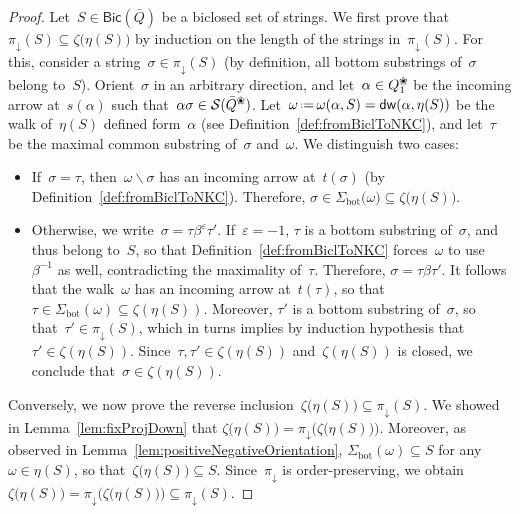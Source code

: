 \documentclass{amsart}
\theoremstyle{definition}
\newcommand{\ssm}{\smallsetminus} %
\newcommand{\eqdef}{\mbox{\,\raisebox{0.2ex}{\scriptsize\ensuremath{\mathrm:}}\ensuremath{=}\,}} %
\newcommand{\blossom}{^\text{\ding{96}}} %
\newcommand{\strings}{\mathcal{S}} %
\newcommand{\distinguishedWalk}[2]{\mathsf{dw}(#1,#2)} %
\newcommand{\bottom}{\mathrm{bot}} %
\newcommand{\Bicl}[1]{\mathsf{Bic}(#1)} %
\newcommand{\projDown}{\pi_\downarrow} %
\begin{document}
\begin{proof}
Let~$S \in \Bicl{\bar Q}$ be a biclosed set of strings.
We first prove that~$\projDown(S) \subseteq \zeta \big( \eta(S) \big)$ by induction on the length of the strings in~$\projDown(S)$.
For this, consider a string~$\sigma \in \projDown(S)$ (by definition, all bottom substrings of~$\sigma$ belong to~$S$).
Orient~$\sigma$ in an arbitrary direction, and let~$\alpha \in Q_1\blossom$ be the incoming arrow at~$s(\alpha)$ such that~$\alpha \sigma \in \strings(\bar Q\blossom)$.
Let~$\omega \eqdef \omega(\alpha,S) = \distinguishedWalk{\alpha}{\eta(S)}$ be the walk of~$\eta(S)$ defined form~$\alpha$ (see Definition~\ref{def:fromBiclToNKC}), and let~$\tau$ be the maximal common substring of~$\sigma$ and~$\omega$.
We distinguish two cases:
\begin{itemize}
\item If~$\sigma = \tau$, then~$\omega \ssm \sigma$ has an incoming arrow at~$t(\sigma)$ (by Definition~\ref{def:fromBiclToNKC}). Therefore, $\sigma \in \Sigma_\bottom \big( \omega \big) \subseteq \zeta \big( \eta(S) \big)$.
\item Otherwise, we write~$\sigma = \tau \beta^\varepsilon \tau'$. If~$\varepsilon = -1$, $\tau$ is a bottom substring of~$\sigma$, and thus belong to~$S$, so that Definition~\ref{def:fromBiclToNKC} forces~$\omega$ to use~$\beta^{-1}$ as well, contradicting the maximality of~$\tau$. Therefore, $\sigma = \tau \beta \tau'$. It follows that the walk~$\omega$ has an incoming arrow at~$t(\tau)$, so that~$\tau \in \Sigma_\bottom(\omega) \subseteq \zeta(\eta(S))$. Moreover, $\tau'$ is a bottom substring of~$\sigma$, so that~$\tau' \in \projDown(S)$, which in turns implies by induction hypothesis that~$\tau' \in \zeta(\eta(S))$. Since~$\tau, \tau' \in \zeta(\eta(S))$ and~$\zeta(\eta(S))$ is closed, we conclude that~$\sigma \in \zeta(\eta(S))$.
\end{itemize}

\medskip
Conversely, we now prove the reverse inclusion~$\zeta \big( \eta(S) \big) \subseteq \projDown(S)$.
We showed in Lemma~\ref{lem:fixProjDown} that ${\zeta \big( \eta(S) \big) = \projDown \big( \zeta \big( \eta(S) \big) \big)}$. 
Moreover, as observed in Lemma~\ref{lem:positiveNegativeOrientation}, ${\Sigma_\bottom(\omega) \subseteq S}$ for any~$\omega \in \eta(S)$, so that~$\zeta \big( \eta(S) \big) \subseteq S$.
Since~$\projDown$ is order-preserving, we obtain~${\zeta \big( \eta(S) \big) = \projDown \big( \zeta \big( \eta(S) \big) \big) \subseteq \projDown (S)}$.
\end{proof}
\end{document}
